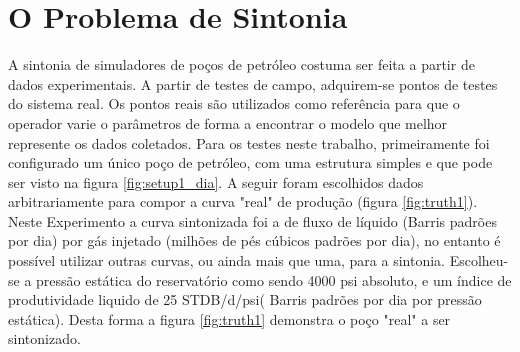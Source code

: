 
\chapter{O Problema de Sintonia} \label{chap:conc}


A sintonia de simuladores de poços de petróleo costuma ser feita a partir de dados experimentais. 
%
A partir de testes de campo, adquirem-se pontos de testes do sistema real.
%
Os pontos reais são utilizados como referência para que o operador varie o parâmetros de forma a encontrar o modelo que melhor represente os dados coletados.
%
%
Para os testes neste trabalho, primeiramente foi configurado um único poço de petróleo, com uma estrutura simples e que pode ser visto na figura \ref{fig:setup1_dia}.
% 
A seguir foram escolhidos dados arbitrariamente para compor a curva "real" de produção (figura \ref{fig:truth1}).
%
Neste Experimento a curva sintonizada foi a de fluxo de líquido (Barris padrões por dia) por gás injetado (milhões de pés cúbicos padrões por dia), no entanto é possível utilizar outras curvas, ou ainda mais que uma, para a sintonia.
%
Escolheu-se a pressão estática do reservatório como sendo 4000 psi absoluto, e um índice de produtividade liquido de 25 STDB/d/psi( Barris padrões por dia por pressão estática). 
%
Desta forma a figura \ref{fig:truth1} demonstra o poço "real" a ser sintonizado.



